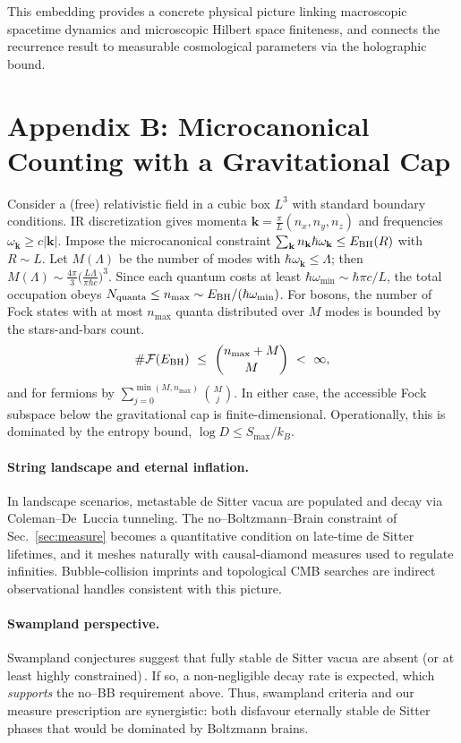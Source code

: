 \documentclass[12pt]{article}
\newcommand{\Smax}{S_{\max}}
\theoremstyle{remark}
\begin{document}
This embedding provides a concrete physical picture linking macroscopic spacetime dynamics and microscopic Hilbert space finiteness, and connects the recurrence result to measurable cosmological parameters via the holographic bound.

\section*{Appendix B: Microcanonical Counting with a Gravitational Cap}
\label{app:microcanonical}

Consider a (free) relativistic field in a cubic box $L^3$ with standard boundary conditions. IR discretization gives momenta $\mathbf k=\frac{\pi}{L}(n_x,n_y,n_z)$ and frequencies $\omega_{\mathbf k}\ge c|\mathbf k|$. Impose the microcanonical constraint $\sum_{\mathbf k} n_{\mathbf k}\hbar\omega_{\mathbf k}\le E_{\rm BH}(R)$ with $R\sim L$.
Let $M(\Lambda)$ be the number of modes with $\hbar\omega_{\mathbf k}\le \Lambda$; then $M(\Lambda)\sim \frac{4\pi}{3}\big(\frac{L\Lambda}{\pi\hbar c}\big)^3$. Since each quantum costs at least $\hbar\omega_{\min}\sim \hbar\pi c/L$, the total occupation obeys $N_{\text{quanta}}\le n_{\max}\sim E_{\rm BH}/(\hbar\omega_{\min})$.
For bosons, the number of Fock states with at most $n_{\max}$ quanta distributed over $M$ modes is bounded by the stars-and-bars count.
\[
\#\mathcal{F}(E_{\rm BH})\ \le\ \binom{n_{\max}+M}{M}\ <\ \infty,
\]
and for fermions by $\sum_{j=0}^{\min(M,n_{\max})}\binom{M}{j}$. In either case, the accessible Fock subspace below the gravitational cap is finite-dimensional. Operationally, this is dominated by the entropy bound, $\log D\le \Smax/k_B$.

\paragraph{String landscape and eternal inflation.}
In landscape scenarios, metastable de Sitter vacua are populated and decay via Coleman–De~Luccia tunneling. The no--Boltzmann--Brain constraint of Sec.~\ref{sec:measure} becomes a quantitative condition on late-time de Sitter lifetimes, and it meshes naturally with causal-diamond measures used to regulate infinities. Bubble-collision imprints and topological CMB searches are indirect observational handles consistent with this picture.

\paragraph{Swampland perspective.}
Swampland conjectures suggest that fully stable de Sitter vacua are absent (or at least highly constrained)\,\cite{Obied2018,Ooguri2019}. If so, a non-negligible decay rate is expected, which \emph{supports} the no--BB requirement above. Thus, swampland criteria and our measure prescription are synergistic: both disfavour eternally stable de Sitter phases that would be dominated by Boltzmann brains.
\end{document}
